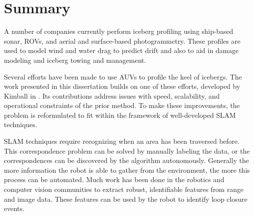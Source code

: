 \section{Summary}

A number of companies currently perform iceberg profiling using ship-based sonar, ROVs, and aerial and surface-based photogrammetry. These profiles are used to model wind and water drag to predict drift and also to aid in damage modeling and iceberg towing and management. 

Several efforts have been made to use AUVs to profile the keel of icebergs. The work presented in this dissertation builds on one of these efforts, developed by Kimball in \cite{Kimball2011b}. Its contributions address issues with speed, scalability, and operational constraints of the prior method. To make these improvements, the problem is reformulated to fit within the framework of well-developed SLAM techniques. 

SLAM techniques require recognizing when an area has been traversed before. This correspondence problem can be solved by manually labeling the data, or the correspondences can be discovered by the algorithm autonomously. Generally the more information the robot is able to gather from the environment, the more this process can be automated. Much work has been done in the robotics and computer vision communities to extract robust, identifiable features from range and image data. These features can be used by the robot to identify loop closure events.

